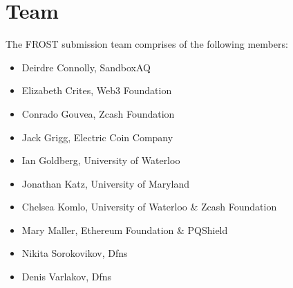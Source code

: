 \section{Team}

The FROST submission team comprises of the following members:

\begin{itemize}
\item Deirdre Connolly, SandboxAQ
\item Elizabeth Crites, Web3 Foundation
\item Conrado Gouvea, Zcash Foundation
\item Jack Grigg, Electric Coin Company
\item Ian Goldberg, University of Waterloo
\item Jonathan Katz, University of Maryland
\item Chelsea Komlo, University of Waterloo \& Zcash Foundation 
\item Mary Maller, Ethereum Foundation \& PQShield
\item Nikita Sorokovikov, Dfns
\item Denis Varlakov, Dfns
\end{itemize}
